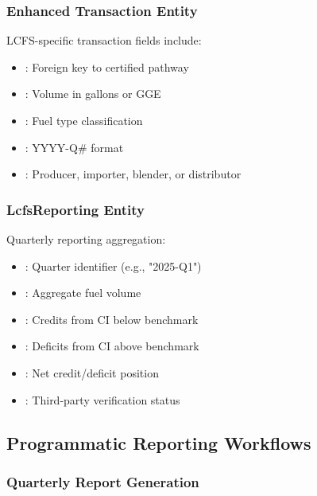 \subsubsection{Enhanced Transaction Entity}

LCFS-specific transaction fields include:

\begin{itemize}
    \item {}: Foreign key to certified pathway
    \item {}: Volume in gallons or GGE
    \item {}: Fuel type classification
    \item {}: YYYY-Q\# format
    \item {}: Producer, importer, blender, or distributor
\end{itemize}

\subsubsection{LcfsReporting Entity}

Quarterly reporting aggregation:

\begin{itemize}
    \item {}: Quarter identifier (e.g., "2025-Q1")
    \item {}: Aggregate fuel volume
    \item {}: Credits from CI below benchmark
    \item {}: Deficits from CI above benchmark
    \item {}: Net credit/deficit position
    \item {}: Third-party verification status
\end{itemize}

\subsection{Programmatic Reporting Workflows}
\label{sec:lcfs-workflows}

\subsubsection{Quarterly Report Generation}

